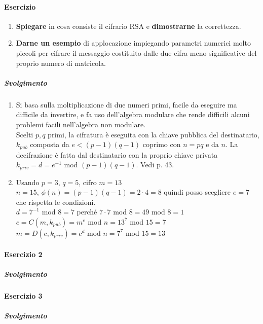 \documentclass[10pt]{book}
\begin{document}
\paragraph{Esercizio} \begin{enumerate}
	\item \textbf{Spiegare} in cosa consiste il cifrario RSA e \textbf{dimostrarne} la correttezza.
	\item \textbf{Darne un esempio} di applocazione impiegando parametri numerici molto piccoli per cifrare il messaggio costituito dalle due cifra meno significative del proprio numero di matricola.
\end{enumerate}
\subparagraph{Svolgimento} \begin{enumerate}
	\item Si basa sulla moltiplicazione di due numeri primi, facile da eseguire ma difficile da invertire, e fa uso dell'algebra modulare che rende difficili alcuni problemi facili nell'algebra non modulare.\\
	Scelti $p,q$ primi, la cifratura è eseguita con la chiave pubblica del destinatario, $k_{pub}$ composta da $e < (p-1)(q-1)$ coprimo con $n = pq$ e da $n$. La decifrazione è fatta dal destinatario con la proprio chiave privata $k_{priv} = d = e^{-1}$ mod $(p-1)(q-1)$. Vedi p. 43.
	\item Usando $p = 3$, $q = 5$, cifro $m = 13$\\
	$n = 15$, $\phi(n) = (p-1)(q-1) = 2\cdot4 = 8$ quindi posso scegliere $e = 7$ che rispetta le condizioni.\\
	$d = 7^{-1}$ mod $8 = 7$ perché $7\cdot 7$ mod $8 = 49$ mod $8 = 1$\\
	$c = C(m, k_{pub}) = m^e$ mod $n = 13^7$ mod $15 = 7$\\
	$m = D(c, k_{priv}) = c^d$ mod $n = 7^7$ mod $15 = 13$
\end{enumerate}
\paragraph{Esercizio 2}
\subparagraph{Svolgimento}
\paragraph{Esercizio 3}
\subparagraph{Svolgimento}
\end{document}

